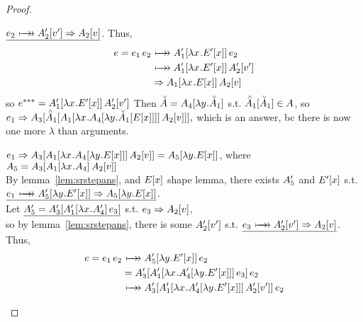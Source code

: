 \documentclass{article}
\begin{document}
\begin{proof}
\begin{byCases}
\begin{byCases}
\begin{byCases}
      $\underline{ \e_2 \srsteps \inA[_2']{\val'} \pstep \Av[_2] }$. Thus,
      \begin{align*}
        \e = \ap{\e_1}{\e_2} &\srsteps \ap{\inA[_1']{\lx\Ex[']}}{\e_2} \\
                            &\srsteps \ap{\inA[_1']{\lx\Ex[']}}
                                         {\inA[_2']{\val'}} \\
                            &\pstep \ap{\inA[_1]{\lx\Ex}}{\inA[_2]{\val}}
      \end{align*}
      so $\ethree=\ap{\inA[_1']{\lx\Ex[']}}{\inA[_2']{\val'}}$
      Then $\Am = \inA[_4]{\ly\Am_1}$ s.t. $\inAp[_1]{\Am_1} \in \A$,
      so $\e_1 \pstep 
      \inA[_3]{\inAp[_1]{\ap{\inA[_1]{\lx\inA[_4]{\ly\inAm[_1]{\Ex}}}}
                           {\Av[_2]}}},$
      which is an answer, bc there is now one more $\lambda$ than arguments.
      \begin{byCases}
        \renewcommand{\byCasesCaseTemplate}[1]{\textbf{Subsubsubcase {#1}.}}
        $\e_1 \pstep 
        \inA[_3]{\ap{\inA[_1]{\lx\inA[_4]{\ly\inE{x}}}}{\Av[_2]}} = 
        \inA[_5]{\ly\inE{x}}$, 
        where $\A_5 = \inA[_3]{{\ap{\inA[_1]{\lx\A_4}}{\Av[_2]}}}$\\
        By lemma~\ref{lem:srstepans}, and $\Ex$ shape lemma, there exists 
        $\A_5'$ and $\Ex[']$ s.t. \\
        $\underline{\e_1 \srsteps \inA[_5']{\ly\Ex[']} 
                         \pstep \inA[_5]{\ly\Ex}}$. \\
        Let $\underline{ \A_5' = \inA[_3']{{\ap{\inA[_1']{\lx\A_4'}}
                                              {\e_3}}} }$ s.t. 
        $\e_3 \pstep \Av[_2]$,\\
        so by lemma~\ref{lem:srstepans}, there is some $\inA[_2']{\val'}$ s.t. 
        $\underline{ \e_3 \srsteps \inA[_2']{\val'} \pstep\Av[_2] }$. Thus,
        \begin{align*}
          \e = \ap{\e_1}{\e_2} 
            &\srsteps \ap{\inA[_5']{\ly\Ex[']}}{\e_2} \\
            &=\ap{\inA[_3']{{\ap{\inA[_1']{\lx\inA[_4']{\ly\Ex[']}}}{\e_3}}}}
                 {\e_2}\\
            &\srsteps\ap{\inA[_3']{{\ap{\inA[_1']{\lx\inA[_4']{\ly\Ex[']}}}
                                       {\inA[_2']{\val'}}}}}{\e_2}\\

\end{align*}
\end{byCases}
\end{byCases}
\end{byCases}
\end{byCases}
\end{proof}
\end{document}
